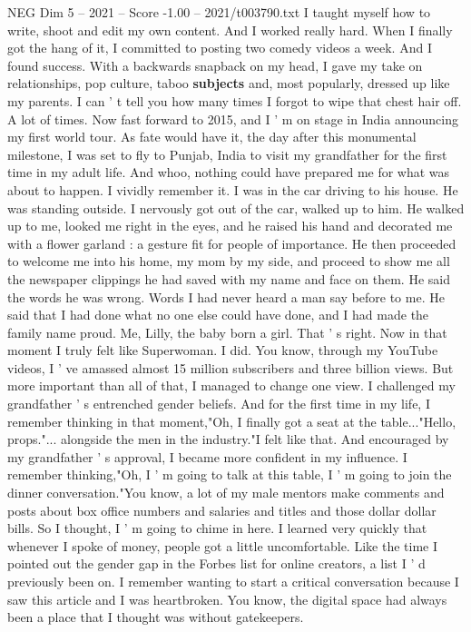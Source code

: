 \begin{textsample}{NEG Dim 5 – 2021 – Score -1.00 – 2021/t003790.txt}
I taught myself how to write, shoot and edit my own content.
And I worked really hard.
When I finally got the hang of it, I committed to posting two comedy videos a week.
And I found success.
With a backwards snapback on my head, I gave my take on relationships, pop culture, taboo \textbf{subjects} and, most popularly, dressed up like my parents.
I can ' t tell you how many times I forgot to wipe that chest hair off.
A lot of times.
Now fast forward to 2015, and I ' m on stage in India announcing my first world tour.
As fate would have it, the day after this monumental milestone, I was set to fly to Punjab, India to visit my grandfather for the first time in my adult life.
And whoo, nothing could have prepared me for what was about to happen.
I vividly remember it.
I was in the car driving to his house.
He was standing outside.
I nervously got out of the car, walked up to him.
He walked up to me, looked me right in the eyes, and he raised his hand and decorated me with a flower garland : a gesture fit for people of importance.
He then proceeded to welcome me into his home, my mom by my side, and proceed to show me all the newspaper clippings he had saved with my name and face on them.
He said the words he was wrong.
Words I had never heard a man say before to me.
He said that I had done what no one else could have done, and I had made the family name proud.
Me, Lilly, the baby born a girl.
That ' s right.
Now in that moment I truly felt like Superwoman.
I did.
You know, through my YouTube videos, I ' ve amassed almost 15 million subscribers and three billion views.
But more important than all of that, I managed to change one view.
I challenged my grandfather ' s entrenched gender beliefs.
And for the first time in my life, I remember thinking in that moment,"Oh, I finally got a seat at the table..."Hello, props."... alongside the men in the industry."I felt like that.
And encouraged by my grandfather ' s approval, I became more confident in my influence.
I remember thinking,"Oh, I ' m going to talk at this table, I ' m going to join the dinner conversation."You know, a lot of my male mentors make comments and posts about box office numbers and salaries and titles and those dollar dollar bills.
So I thought, I ' m going to chime in here.
I learned very quickly that whenever I spoke of money, people got a little uncomfortable.
Like the time I pointed out the gender gap in the Forbes list for online creators, a list I ' d previously been on.
I remember wanting to start a critical conversation because I saw this article and I was heartbroken.
You know, the digital space had always been a place that I thought was without gatekeepers.

\end{textsample}
